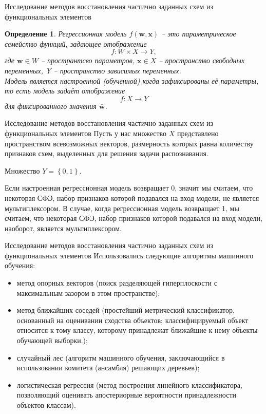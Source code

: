 \documentclass[serif,utf8]{beamer}
\newtheorem{mydef}{Определение}
\begin{document}
\begin{frame}{Исследование методов восстановления частично заданных схем из функциональных элементов}
\begin{mydef}
Регрессионная модель $f(\mathbf{w},\mathbf{x})$ -- это параметрическое семейство функций, задающее отображение
\begin{equation}
f: W \times X \longrightarrow Y,
\end{equation}
где $\mathbf{w} \in W$ -- пространтсво параметров, $\mathbf{x} \in X$ -- пространство свободных переменных, Y -- пространство зависимых переменных.\\
Модель является настроенной (обученной) когда зафиксированы её параметры, то есть модель задаёт отображение
\begin{equation}
f:X \longrightarrow Y
\end{equation}
для фиксированного значения $\bar{\mathbf{w}}$.
\end{mydef}
\end{frame}


\begin{frame}{Исследование методов восстановления частично заданных схем из функциональных элементов}
Пусть у нас множество $X$ представлено пространством всевозможных векторов,  размерность которых равна количеству признаков схем, выделенных для решения задачи распознавания.\par
Множество $Y = \left\{ 0, 1 \right\}$.\par
Если настроенная регрессионная модель возвращает 0, значит мы считаем, что некоторая СФЭ, набор признаков которой подавался на вход модели, не является мультиплексором. В случае, когда регрессионная модель возвращает 1, мы считаем, что некоторая СФЭ, набор признаков которой подавался на вход модели, наоборот, является мультиплексором.\par
\end{frame}

\begin{frame}{Исследование методов восстановления частично заданных схем из функциональных элементов} 
Иcпользовались следующие алгоритмы машинного обучения:
\small{\begin{itemize}
\item метод опорных векторов (поиск разделяющей гиперплоскости с максимальным зазором в этом пространстве);
\item метод ближайших соседей (простейший метрический классификатор, основанный на оценивании сходства объектов; классифицируемый объект относится к тому классу, которому принадлежат ближайшие к нему объекты обучающей выборки.);
\item случайный лес (алгоритм машинного обучения, заключающийся в использовании комитета (ансамбля) решающих деревьев);
\item логистическая регрессия (метод построения линейного классификатора, позволяющий оценивать апостериорные вероятности принадлежности объектов классам).
\end{itemize}
}
\end{frame}
\end{document}
